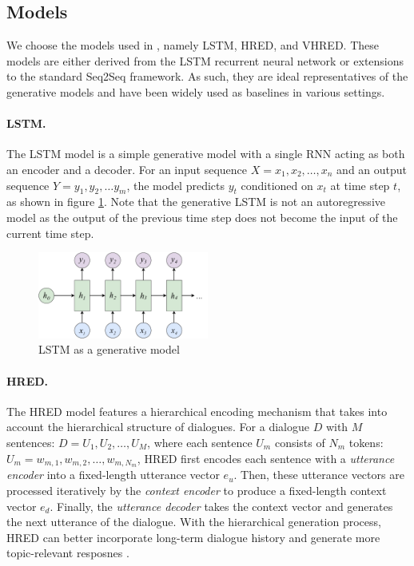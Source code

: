 \documentclass[runningheads]{llncs}
\begin{document}
    \subsection{Models}
    We choose the models used in \cite{VHRED}, namely LSTM, HRED, and VHRED. These models are either derived from the LSTM recurrent neural network \cite{LSTM} or extensions to the standard Seq2Seq framework. As such, they are ideal representatives of the generative models and have been widely used as baselines in various settings.

    \paragraph{LSTM.}
    The LSTM model is a simple generative model with a single RNN acting as both an encoder and a decoder. For an input sequence $X = x_1, x_2, \dots, x_n$ and an output sequence $Y = y_1, y_2, \dots y_m$, the model predicts $y_t$ conditioned on $x_t$ at time step $t$, as shown in figure \ref{fig:LSTM_as_generative}. Note that the generative LSTM is not an autoregressive model as the output of the previous time step does not become the input of the current time step.
    \begin{figure}
        \centering
        \includegraphics[width=0.5\textwidth]{figure/LSTM/generative.pdf}
        \caption{LSTM as a generative model}
        \label{fig:LSTM_as_generative}
    \end{figure}

    \paragraph{HRED.}
    The HRED model \cite{hred-qs,HRED} features a hierarchical encoding mechanism that takes into account the hierarchical structure of dialogues. For a dialogue $D$ with $M$ sentences: $D = U_1, U_2, \dots, U_M$, where each sentence $U_m$ consists of $N_m$ tokens: $U_m = w_{m, 1}, w_{m, 2}, \dots, w_{m, N_m}$, HRED first encodes each sentence with a \emph{utterance encoder} into a fixed-length utterance vector $e_u$. Then, these utterance vectors are processed iteratively by the \emph{context encoder} to produce a fixed-length context vector $e_d$. Finally, the \emph{utterance decoder} takes the context vector and generates the next utterance of the dialogue. With the hierarchical generation process, HRED can better incorporate long-term dialogue history and generate more topic-relevant resposnes \cite{A_Short_Review}.
\end{document}
